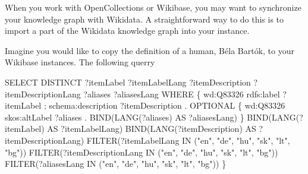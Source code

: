 \documentclass[
  letterpaper,
  DIV=11,
  numbers=noendperiod]{scrreprt}
\newenvironment{Shaded}{\begin{snugshade}}{\end{snugshade}}
\newcommand{\FunctionTok}[1]{\textcolor[rgb]{0.28,0.35,0.67}{#1}}
\newcommand{\NormalTok}[1]{\textcolor[rgb]{0.00,0.23,0.31}{#1}}
\newcommand{\SpecialCharTok}[1]{\textcolor[rgb]{0.37,0.37,0.37}{#1}}
\newcommand{\StringTok}[1]{\textcolor[rgb]{0.13,0.47,0.30}{#1}}
\begin{document}
When you work with OpenCollections or Wikibase, you may want to
synchronize your knowledge graph with Wikidata. A straightforward way to
do this is to import a part of the Wikidata knowledge graph into your
instance.

Imagine you would like to copy the definition of a human, Béla Bartók,
to your Wikibase instances. The following querry

\begin{Shaded}
\begin{Highlighting}[]
\NormalTok{SELECT DISTINCT ?itemLabel ?itemLabelLang ?itemDescription ?itemDescriptionLang ?aliases ?aliasesLang WHERE \{}
\NormalTok{  wd}\SpecialCharTok{:}\NormalTok{Q83326 rdfs}\SpecialCharTok{:}\NormalTok{label ?itemLabel ;}
\NormalTok{            schema}\SpecialCharTok{:}\NormalTok{description ?itemDescription .}
\NormalTok{  OPTIONAL \{}
\NormalTok{    wd}\SpecialCharTok{:}\NormalTok{Q83326 skos}\SpecialCharTok{:}\NormalTok{altLabel ?aliases .}
    \FunctionTok{BIND}\NormalTok{(}\FunctionTok{LANG}\NormalTok{(?aliases) AS ?aliasesLang)}
\NormalTok{  \}}
  \FunctionTok{BIND}\NormalTok{(}\FunctionTok{LANG}\NormalTok{(?itemLabel) AS ?itemLabelLang)}
  \FunctionTok{BIND}\NormalTok{(}\FunctionTok{LANG}\NormalTok{(?itemDescription) AS ?itemDescriptionLang)}
  \FunctionTok{FILTER}\NormalTok{(?itemLabelLang }\FunctionTok{IN}\NormalTok{ (}\StringTok{"en"}\NormalTok{, }\StringTok{"de"}\NormalTok{, }\StringTok{"hu"}\NormalTok{, }\StringTok{"sk"}\NormalTok{, }\StringTok{"lt"}\NormalTok{, }\StringTok{"bg"}\NormalTok{))}
  \FunctionTok{FILTER}\NormalTok{(?itemDescriptionLang }\FunctionTok{IN}\NormalTok{ (}\StringTok{"en"}\NormalTok{, }\StringTok{"de"}\NormalTok{, }\StringTok{"hu"}\NormalTok{, }\StringTok{"sk"}\NormalTok{, }\StringTok{"lt"}\NormalTok{, }\StringTok{"bg"}\NormalTok{))}
  \FunctionTok{FILTER}\NormalTok{(?aliasesLang }\FunctionTok{IN}\NormalTok{ (}\StringTok{"en"}\NormalTok{, }\StringTok{"de"}\NormalTok{, }\StringTok{"hu"}\NormalTok{, }\StringTok{"sk"}\NormalTok{, }\StringTok{"lt"}\NormalTok{, }\StringTok{"bg"}\NormalTok{))}
\NormalTok{\}}
\end{Highlighting}
\end{Shaded}
\end{document}
